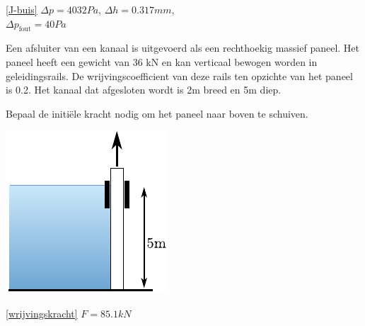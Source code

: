 \begin{antwoord}{\ref{J-buis}}
	$\Delta p = 4032\unit{Pa}$, $\Delta h = 0.317\unit{mm}$,\\ $\Delta p_{\text{fout}} = 40\unit{Pa}$
\end{antwoord}
\begin{toepassing}[*]
	\label{wrijvingskracht}
Een afsluiter van een kanaal is uitgevoerd als een rechthoekig massief paneel. Het paneel heeft een gewicht van 36 kN en kan verticaal bewogen worden in geleidingsrails. De wrijvingscoefficient van deze rails ten opzichte van het paneel is 0.2. Het kanaal dat afgesloten wordt is 2m breed en 5m diep.
		
Bepaal de initiële kracht nodig om het paneel naar boven te schuiven.

	\centering
	\includegraphics{fig/hydrostatica/wrijvingskracht}
\end{toepassing}
\begin{antwoord}{\ref{wrijvingskracht}}
	$F = 85.1\unit{kN}$
\end{antwoord}
